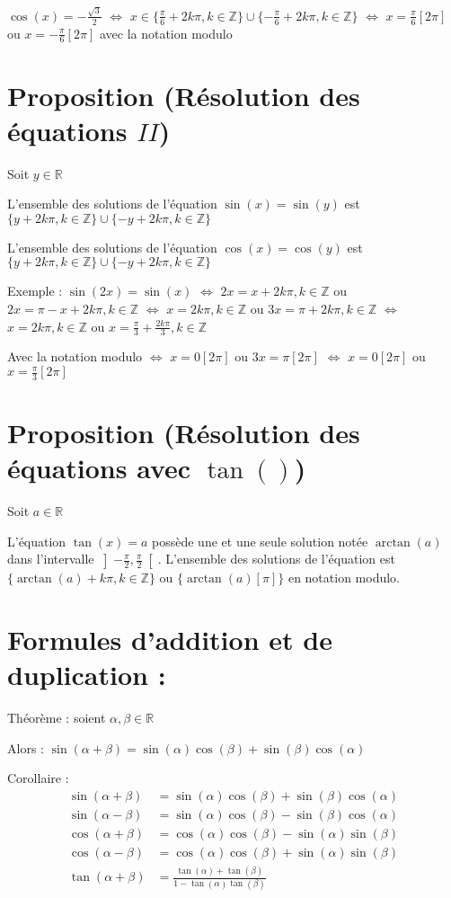 \documentclass{article}
\begin{document}
$\cos(x) = -\frac{\sqrt{3}}{2}$ 
$\iff$ $x \in \{ \frac{\pi}{6} + 2k\pi, k \in \mathbb{Z} \} \cup \{-\frac{\pi}{6} + 2k\pi, k \in \mathbb{Z} \}$
$\iff$ $x=\frac{\pi}{6} [ 2\pi ]$ ou $x=-\frac{\pi}{6} [ 2\pi ]$ avec la notation modulo

\section{Proposition (Résolution des équations $II$)}

Soit $y \in \mathbb{R}$

L'ensemble des solutions de l'équation $\sin(x)=\sin(y)$ est $\{ y + 2k\pi, k \in \mathbb{Z} \} \cup \{ -y + 2k\pi, k \in \mathbb{Z} \}$

L'ensemble des solutions de l'équation $\cos(x)=\cos(y)$ est $\{ y + 2k\pi, k \in \mathbb{Z} \} \cup \{ -y + 2k\pi, k \in \mathbb{Z} \}$

Exemple :  $\sin(2x) = \sin(x)$
$\iff$ $2x=x+2k\pi, k \in \mathbb{Z}$
	ou $2x=\pi-x+2k\pi, k \in \mathbb{Z}$
$\iff$ $x=2k\pi, k \in \mathbb{Z}$
	ou $3x=\pi+2k\pi, k \in \mathbb{Z}$
$\iff$ $x=2k\pi, k \in \mathbb{Z}$
	ou $x=\frac{\pi}{3} + \frac{2k\pi}{3}, k \in \mathbb{Z}$

Avec la notation modulo 
$\iff$ $x = 0 [2\pi]$
	ou $3x = \pi [2\pi]$
$\iff$ $x = 0 [2\pi]$
	ou $x = \frac{\pi}{3} [2\pi]$

\section{Proposition (Résolution des équations avec $\tan()$)}

Soit $a \in \mathbb{R}$

L'équation $\tan(x)=a$ possède une et une seule solution notée $\arctan(a)$ dans l'intervalle $\left]-\frac{\pi}{2}, \frac{\pi}{2} \right[$. L'ensemble des solutions de l'équation est $\{ \arctan(a) + k\pi, k \in \mathbb{Z} \}$ ou $\{ \arctan(a)[\pi] \}$ en notation modulo.

\section{Formules d'addition et de duplication :}

Théorème : soient $\alpha, \beta \in \mathbb{R}$

Alors : $\sin(\alpha + \beta) = \sin(\alpha)\cos(\beta) + \sin(\beta)\cos(\alpha)$

Corollaire :
\begin{align*}
\sin(\alpha + \beta) &= \sin(\alpha)\cos(\beta) + \sin(\beta)\cos(\alpha) \\
\sin(\alpha - \beta) &= \sin(\alpha)\cos(\beta) - \sin(\beta)\cos(\alpha) \\
\cos(\alpha + \beta) &= \cos(\alpha)\cos(\beta) - \sin(\alpha)\sin(\beta) \\
\cos(\alpha - \beta) &= \cos(\alpha)\cos(\beta) + \sin(\alpha)\sin(\beta) \\
\tan(\alpha+\beta) &= \frac{\tan(\alpha) + \tan(\beta)}{1 - \tan(\alpha)\tan(\beta)}
\end{align*}
\end{document}
